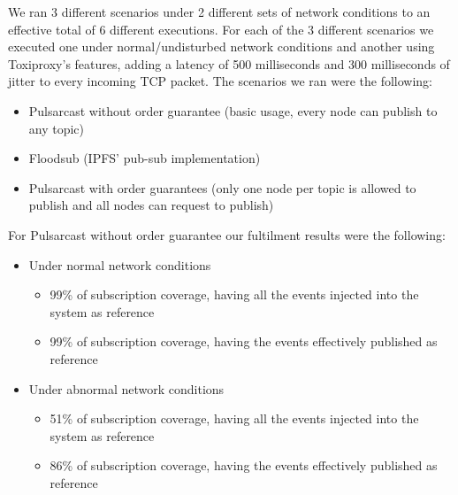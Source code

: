 We ran 3 different scenarios under 2 different sets of network conditions to an
effective total of 6 different executions. For each of the 3 different
scenarios we executed one under normal/undisturbed network conditions and
another using Toxiproxy's features, adding a latency of 500 milliseconds and
300 milliseconds of jitter to every incoming TCP packet. The scenarios we ran
were the following:

\begin{itemize}
  \item Pulsarcast without order guarantee (basic usage, every node can publish to any topic)
  \item Floodsub (IPFS' pub-sub implementation)
  \item Pulsarcast with order guarantees (only one node per topic is allowed to publish and all nodes can request to publish)
\end{itemize}

For Pulsarcast without order guarantee our fultilment results were the following:
\begin{itemize}
\item Under normal network conditions
\begin{itemize}
  \item 99\% of subscription coverage, having all the events injected into the system as reference
  \item 99\% of subscription coverage, having the events effectively published as reference
\end{itemize}
\item Under abnormal network conditions
\begin{itemize}
  \item 51\% of subscription coverage, having all the events injected into the system as reference
  \item 86\% of subscription coverage, having the events effectively published as reference
\end{itemize}
\end{itemize}

